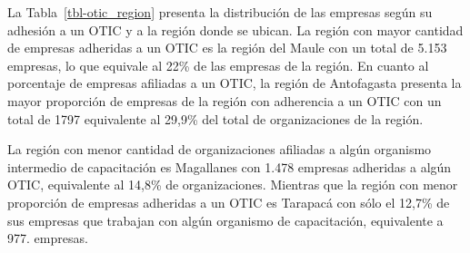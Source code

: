 \documentclass[
  11pt,
]{article}
\begin{document}
\newpage

La Tabla~\ref{tbl-otic_region} presenta la distribución de las empresas
según su adhesión a un OTIC y a la región donde se ubican. La región con
mayor cantidad de empresas adheridas a un OTIC es la región del Maule
con un total de 5.153 empresas, lo que equivale al 22\% de las empresas
de la región. En cuanto al porcentaje de empresas afiliadas a un OTIC,
la región de Antofagasta presenta la mayor proporción de empresas de la
región con adherencia a un OTIC con un total de 1797 equivalente al
29,9\% del total de organizaciones de la región.

La región con menor cantidad de organizaciones afiliadas a algún
organismo intermedio de capacitación es Magallanes con 1.478 empresas
adheridas a algún OTIC, equivalente al 14,8\% de organizaciones.
Mientras que la región con menor proporción de empresas adheridas a un
OTIC es Tarapacá con sólo el 12,7\% de sus empresas que trabajan con
algún organismo de capacitación, equivalente a 977. empresas.
\end{document}
